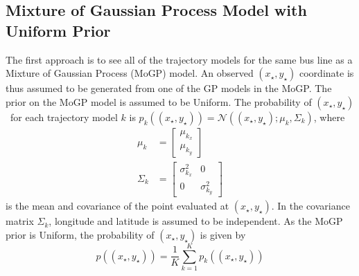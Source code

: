 \subsection{Mixture of Gaussian Process Model with Uniform Prior}
The first approach is to see all of the trajectory models for the same bus line as a Mixture of Gaussian Process (MoGP) model.
An observed $(x_\star, y_\star)$ coordinate is thus assumed to be generated from one of the GP models in the MoGP.
The prior on the MoGP model is assumed to be Uniform.
The probability of $(x_\star, y_\star)$ for each trajectory model $k$ is 
\(
    p_k((x_\star,y_\star)) = \mathcal{N}((x_\star,y_\star); \mu_k, \Sigma_k)
\), where
\begin{align}
\mu_k &= \begin{bmatrix} \mu_{k_x} \\ \mu_{k_y} \end{bmatrix} \\
\Sigma_k &= \begin{bmatrix} \sigma^2_{k_x} & 0 \\ 0 & \sigma^2_{k_y} \end{bmatrix}
\end{align}
is the mean and covariance of the point evaluated at $(x_\star,y_\star)$.
In the covariance matrix $\Sigma_k$, longitude and latitude is assumed to be independent.
As the MoGP prior is Uniform, the probability of $(x_\star, y_\star)$ is given by
\begin{equation}
    p((x_\star, y_\star)) = \frac{1}{K}\sum_{k=1}^K p_k((x_\star,y_\star)) 
\end{equation}

